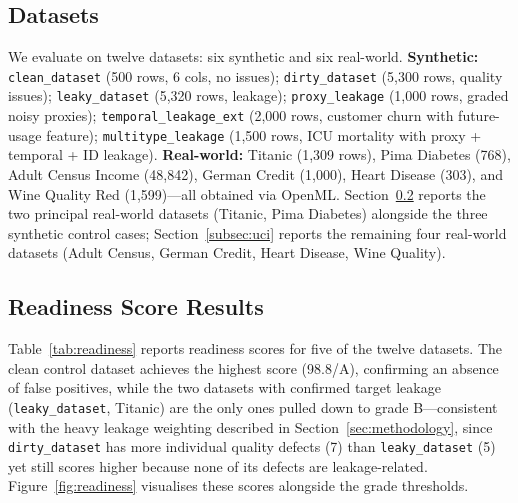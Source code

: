 \documentclass[11pt]{article}
\begin{document}
\subsection{Datasets}

We evaluate on twelve datasets: six synthetic and six real-world.
\textbf{Synthetic:} \texttt{clean\_dataset} (500 rows, 6 cols, no issues);
\texttt{dirty\_dataset} (5,300 rows, quality issues); \texttt{leaky\_dataset}
(5,320 rows, leakage); \texttt{proxy\_leakage} (1,000 rows, graded noisy
proxies); \texttt{temporal\_leakage\_ext} (2,000 rows, customer churn with
future-usage feature); \texttt{multitype\_leakage} (1,500 rows, ICU mortality
with proxy + temporal + ID leakage).  \textbf{Real-world:} Titanic (1,309
rows), Pima Diabetes (768), Adult Census Income (48,842), German Credit
(1,000), Heart Disease (303), and Wine Quality Red (1,599)---all obtained
via OpenML.  Section~\ref{subsec:readiness} reports the two principal
real-world datasets (Titanic, Pima Diabetes) alongside the three synthetic
control cases; Section~\ref{subsec:uci} reports the remaining four
real-world datasets (Adult Census, German Credit, Heart Disease, Wine
Quality).

\subsection{Readiness Score Results}
\label{subsec:readiness}

Table~\ref{tab:readiness} reports readiness scores for five of the twelve
datasets.  The clean control dataset achieves the highest score (98.8/A),
confirming an absence of false positives, while the two datasets with
confirmed target leakage (\texttt{leaky\_dataset}, Titanic) are the only
ones pulled down to grade B---consistent with the heavy leakage weighting
described in Section~\ref{sec:methodology}, since \texttt{dirty\_dataset}
has more individual quality defects (7) than \texttt{leaky\_dataset} (5) yet
still scores higher because none of its defects are leakage-related.
Figure~\ref{fig:readiness} visualises these scores alongside the grade
thresholds.
\end{document}
